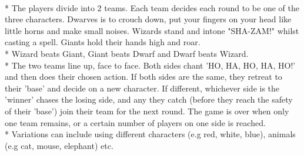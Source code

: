 \begin{minipage}{\textwidth}
\\*
The players divide into 2 teams.  Each team decides each round to be one of the three characters.  Dwarves is to crouch down, put your fingers on your head like little horns and make small noises.  Wizards stand and intone "SHA-ZAM!" whilst casting a spell. Giants hold their hands high and roar.\\*
Wizard beats Giant, Giant beats Dwarf and Dwarf beats Wizard.\\*
The two teams line up, face to face.  Both sides chant 'HO, HA, HO, HA, HO!' and then does their chosen action.  If both sides are the same, they retreat to their 'base' and decide on a new character.  If different, whichever side is the 'winner' chases the losing side, and any they catch (before they reach the safety of their 'base') join their team for the next round.  The game is over when only one team remains, or a certain number of players on one side is reached.\\*
Variations can include using different characters (e.g red, white, blue), animals (e.g cat, mouse, elephant) etc.
\end{minipage}    \vfill
